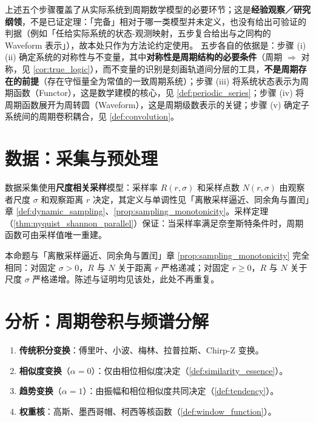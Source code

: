 \begin{remark}\label{prop:modelling_completeness}
上述五个步骤覆盖了从实际系统到周期数学模型的必要环节；这是\textbf{经验观察／研究纲领}，不是已证定理：「完备」相对于哪一类模型并未定义，也没有给出可验证的判据（例如「任给实际系统的状态-观测映射，五步复合给出与之同构的 Waveform 表示」），故本处只作为方法论约定使用。
五步各自的依据是：步骤 (i)(ii) 确定系统的对称性与不变量，其中\textbf{对称性是周期结构的必要条件}（周期 $\Rightarrow$ 对称，见 \cref{cor:true_logic}），而不变量的识别是刻画轨道间分层的工具，\textbf{不是周期存在的前提}（存在守恒量全为常值的一致周期系统）；步骤 (iii) 将系统状态表示为周期函数（Functor），这是数学建模的核心，见 \cref{def:periodic_series}；步骤 (iv) 将周期函数展开为周转圆（Waveform），这是周期级数表示的关键；步骤 (v) 确定子系统间的周期卷积耦合，见 \cref{def:convolution}。
\end{remark}

\section{数据：采集与预处理}

\begin{definition}[数据采集的周期数学框架]\label{def:data_acquisition}
数据采集使用\textbf{尺度相关采样}模型：采样率 $R(r,\sigma)$ 和采样点数 $N(r,\sigma)$ 由观察者尺度 $\sigma$ 和观察距离 $r$ 决定，其定义与单调性见「离散采样逼近、同余角与置闰」章 \cref{def:dynamic_sampling}、\cref{prop:sampling_monotonicity}。采样定理（\cref{thm:nyquist_shannon_parallel}）保证：当采样率满足奈奎斯特条件时，周期函数可由采样值唯一重建。
\end{definition}

\begin{remark}[动态采样的单调性（引用）]\label{prop:dynamic_sampling_monotonicity}
本命题与「离散采样逼近、同余角与置闰」章 \cref{prop:sampling_monotonicity} 完全相同：对固定 $\sigma>0$，$R$ 与 $N$ 关于距离 $r$ 严格递减；对固定 $r\ge0$，$R$ 与 $N$ 关于尺度 $\sigma$ 严格递增。陈述与证明均见该处，此处不再重复。
\end{remark}

\section{分析：周期卷积与频谱分解}

\begin{definition}[分析的完整工具链]\label{def:analysis_toolchain}
\begin{enumerate}[label=(\roman*)]
    \item \textbf{传统积分变换}：傅里叶、小波、梅林、拉普拉斯、Chirp-Z 变换。
    \item \textbf{相似度变换}（$\alpha=0$）：仅由相位相似度决定（\cref{def:similarity_essence}）。
    \item \textbf{趋势变换}（$\alpha=1$）：由振幅和相位相似度共同决定（\cref{def:tendency}）。
    \item \textbf{权重核}：高斯、墨西哥帽、柯西等核函数（\cref{def:window_function}）。
\end{enumerate}
\end{definition}

